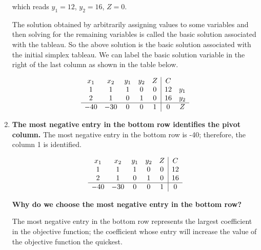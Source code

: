 \begin{solution}
\begin{enumerate}
              which reads \(y_1 = 12\), \(y_2 = 16\), \(Z = 0\).

              The solution obtained by arbitrarily assigning values to some variables and then solving for the remaining variables is called the basic solution associated with the tableau. So the above solution is the basic solution associated with the initial simplex tableau. We can label the basic solution variable in the right of the last column as shown in the table below.

              \[
                  \begin{array}{c c c c c | c c}

                      x_1 & x_2 & y_1 & y_2 & Z & C  &     \\

                      1   & 1   & 1   & 0   & 0 & 12 & y_1 \\
                      2   & 1   & 0   & 1   & 0 & 16 & y_2 \\
                      \hline
                      -40 & -30 & 0   & 0   & 1 & 0  & Z   \\
                  \end{array}
              \]


        \item \textbf{The most negative entry in the bottom row identifies the pivot column.}
              The most negative entry in the bottom row is -40; therefore, the column 1 is identified.

              \[
                  \begin{array}{c c c c c| c}

                      x_1 & x_2 & y_1 & y_2 & Z & C  \\
                      1   & 1   & 1   & 0   & 0 & 12 \\
                      2   & 1   & 0   & 1   & 0 & 16 \\
                      \hline
                      -40 & -30 & 0   & 0   & 1 & 0  \\
                  \end{array}
              \]

              \textbf{Why do we choose the most negative entry in the bottom row?}

              The most negative entry in the bottom row represents the largest coefficient in the objective function; the coefficient whose entry will increase the value of the objective function the quickest.


\end{enumerate}
\end{solution}
